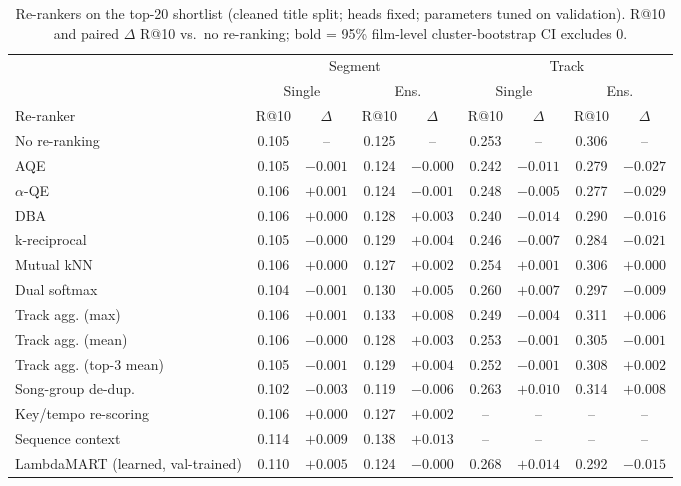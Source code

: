 \begin{table}[t]
\centering
\small
\caption{Re-rankers on the top-20 shortlist (cleaned title split; heads fixed; parameters tuned on validation).
R@10 and paired $\Delta$ R@10 vs.\ no re-ranking; bold = 95\% film-level cluster-bootstrap CI excludes 0.}
\label{tab:supp_rerank}
\begin{tabular}{@{}lcccccccc@{}}
\toprule
 & \multicolumn{4}{c}{Segment} & \multicolumn{4}{c}{Track} \\
\cmidrule(lr){2-5}\cmidrule(lr){6-9}
 & \multicolumn{2}{c}{Single} & \multicolumn{2}{c}{Ens.} & \multicolumn{2}{c}{Single} & \multicolumn{2}{c}{Ens.} \\
Re-ranker & R@10 & $\Delta$ & R@10 & $\Delta$ & R@10 & $\Delta$ & R@10 & $\Delta$ \\
\midrule
No re-ranking & 0.105 & -- & 0.125 & -- & 0.253 & -- & 0.306 & -- \\
AQE & 0.105 & $-0.001$ & 0.124 & $-0.000$ & 0.242 & $\mathbf{-0.011}$ & 0.279 & $\mathbf{-0.027}$ \\
$\alpha$-QE & 0.106 & $+0.001$ & 0.124 & $-0.001$ & 0.248 & $-0.005$ & 0.277 & $\mathbf{-0.029}$ \\
DBA & 0.106 & $+0.000$ & 0.128 & $+0.003$ & 0.240 & $\mathbf{-0.014}$ & 0.290 & $-0.016$ \\
k-reciprocal & 0.105 & $-0.000$ & 0.129 & $+0.004$ & 0.246 & $\mathbf{-0.007}$ & 0.284 & $-0.021$ \\
Mutual kNN & 0.106 & $+0.000$ & 0.127 & $+0.002$ & 0.254 & $+0.001$ & 0.306 & $+0.000$ \\
Dual softmax & 0.104 & $-0.001$ & 0.130 & $+0.005$ & 0.260 & $\mathbf{+0.007}$ & 0.297 & $-0.009$ \\
Track agg. (max) & 0.106 & $+0.001$ & 0.133 & $\mathbf{+0.008}$ & 0.249 & $-0.004$ & 0.311 & $+0.006$ \\
Track agg. (mean) & 0.106 & $-0.000$ & 0.128 & $+0.003$ & 0.253 & $-0.001$ & 0.305 & $-0.001$ \\
Track agg. (top-3 mean) & 0.105 & $-0.001$ & 0.129 & $+0.004$ & 0.252 & $-0.001$ & 0.308 & $+0.002$ \\
Song-group de-dup. & 0.102 & $-0.003$ & 0.119 & $-0.006$ & 0.263 & $\mathbf{+0.010}$ & 0.314 & $\mathbf{+0.008}$ \\
Key/tempo re-scoring & 0.106 & $+0.000$ & 0.127 & $+0.002$ & -- & -- & -- & -- \\
Sequence context & 0.114 & $\mathbf{+0.009}$ & 0.138 & $\mathbf{+0.013}$ & -- & -- & -- & -- \\
LambdaMART (learned, val-trained) & 0.110 & $\mathbf{+0.005}$ & 0.124 & $-0.000$ & 0.268 & $\mathbf{+0.014}$ & 0.292 & $-0.015$ \\
\bottomrule
\end{tabular}
\end{table}

